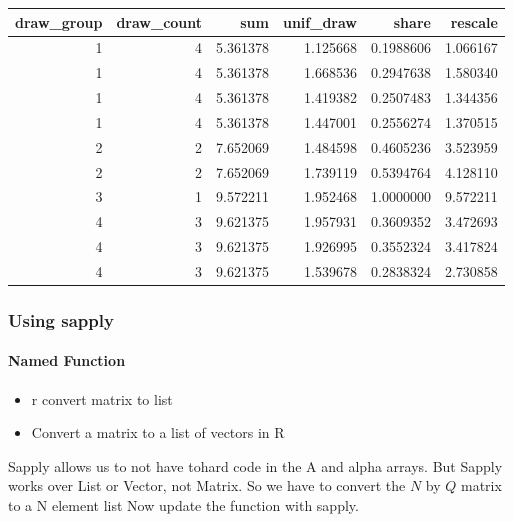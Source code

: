 \documentclass[
]{book}
\providecommand{\tightlist}{%
  \setlength{\itemsep}{0pt}\setlength{\parskip}{0pt}}
\begin{document}
\begin{table}[!h]
\centering
\begin{tabular}{r|r|r|r|r|r}
\hline
draw\_group & draw\_count & sum & unif\_draw & share & rescale\\
\hline
\rowcolor{gray!6}  1 & 4 & 5.361378 & 1.125668 & 0.1988606 & 1.066167\\
\hline
1 & 4 & 5.361378 & 1.668536 & 0.2947638 & 1.580340\\
\hline
\rowcolor{gray!6}  1 & 4 & 5.361378 & 1.419382 & 0.2507483 & 1.344356\\
\hline
1 & 4 & 5.361378 & 1.447001 & 0.2556274 & 1.370515\\
\hline
\rowcolor{gray!6}  2 & 2 & 7.652069 & 1.484598 & 0.4605236 & 3.523959\\
\hline
2 & 2 & 7.652069 & 1.739119 & 0.5394764 & 4.128110\\
\hline
\rowcolor{gray!6}  3 & 1 & 9.572211 & 1.952468 & 1.0000000 & 9.572211\\
\hline
4 & 3 & 9.621375 & 1.957931 & 0.3609352 & 3.472693\\
\hline
\rowcolor{gray!6}  4 & 3 & 9.621375 & 1.926995 & 0.3552324 & 3.417824\\
\hline
4 & 3 & 9.621375 & 1.539678 & 0.2838324 & 2.730858\\
\hline
\end{tabular}
\end{table}

\hypertarget{using-sapply}{%
\subsubsection{Using sapply}\label{using-sapply}}

\hypertarget{named-function-1}{%
\paragraph{Named Function}\label{named-function-1}}

\begin{itemize}
\tightlist
\item
  r convert matrix to list
\item
  Convert a matrix to a list of vectors in R
\end{itemize}

Sapply allows us to not have tohard code in the A and alpha arrays. But Sapply works over List or Vector, not Matrix. So we have to convert the \(N\) by \(Q\) matrix to a N element list
Now update the function with sapply.
\end{document}

